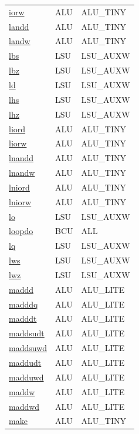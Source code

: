 \begin{small}
\begin{longtable}[l]{l l l}
\hyperlink{lvx.iorw}{iorw} & ALU & ALU\_TINY \\ 
\hyperlink{lvx.landd}{landd} & ALU & ALU\_TINY \\ 
\hyperlink{lvx.landw}{landw} & ALU & ALU\_TINY \\ 
\hyperlink{lvx.lbs}{lbs} & LSU & LSU\_AUXW \\ 
\hyperlink{lvx.lbz}{lbz} & LSU & LSU\_AUXW \\ 
\hyperlink{lvx.ld}{ld} & LSU & LSU\_AUXW \\ 
\hyperlink{lvx.lhs}{lhs} & LSU & LSU\_AUXW \\ 
\hyperlink{lvx.lhz}{lhz} & LSU & LSU\_AUXW \\ 
\hyperlink{lvx.liord}{liord} & ALU & ALU\_TINY \\ 
\hyperlink{lvx.liorw}{liorw} & ALU & ALU\_TINY \\ 
\hyperlink{lvx.lnandd}{lnandd} & ALU & ALU\_TINY \\ 
\hyperlink{lvx.lnandw}{lnandw} & ALU & ALU\_TINY \\ 
\hyperlink{lvx.lniord}{lniord} & ALU & ALU\_TINY \\ 
\hyperlink{lvx.lniorw}{lniorw} & ALU & ALU\_TINY \\ 
\hyperlink{lvx.lo}{lo} & LSU & LSU\_AUXW \\ 
\hyperlink{lvx.loopdo}{loopdo} & BCU & ALL \\ 
\hyperlink{lvx.lq}{lq} & LSU & LSU\_AUXW \\ 
\hyperlink{lvx.lws}{lws} & LSU & LSU\_AUXW \\ 
\hyperlink{lvx.lwz}{lwz} & LSU & LSU\_AUXW \\ 
\hyperlink{lvx.maddd}{maddd} & ALU & ALU\_LITE \\ 
\hyperlink{lvx.madddq}{madddq} & ALU & ALU\_LITE \\ 
\hyperlink{lvx.madddt}{madddt} & ALU & ALU\_LITE \\ 
\hyperlink{lvx.maddsudt}{maddsudt} & ALU & ALU\_LITE \\ 
\hyperlink{lvx.maddsuwd}{maddsuwd} & ALU & ALU\_LITE \\ 
\hyperlink{lvx.maddudt}{maddudt} & ALU & ALU\_LITE \\ 
\hyperlink{lvx.madduwd}{madduwd} & ALU & ALU\_LITE \\ 
\hyperlink{lvx.maddw}{maddw} & ALU & ALU\_LITE \\ 
\hyperlink{lvx.maddwd}{maddwd} & ALU & ALU\_LITE \\ 
\hyperlink{lvx.make}{make} & ALU & ALU\_TINY \\ 

\end{longtable}
\end{small}

